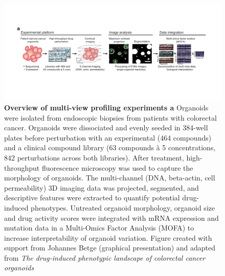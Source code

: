 \begin{flushleft}
\begin{figure}[h]
\centering
\includegraphics[width=\textwidth,
                height=\textheight,
                keepaspectratio]{figures/promise/pdf/fig_1_1.pdf}
\caption[Overview of multi-view profiling experiments]{\textbf{Overview of multi-view profiling experiments a} Organoids were isolated from endoscopic biopsies from patients with colorectal cancer. Organoids were dissociated and evenly seeded in 384-well plates before perturbation with an experimental (464 compounds) and a clinical compound library (63 compounds à 5 concentrations, 842 perturbations across both libraries). After treatment, high-throughput fluorescence microscopy was used to capture the morphology of organoids.  The multi-channel (DNA, beta-actin, cell permeability) 3D imaging data was projected, segmented, and descriptive features were extracted to quantify potential drug-induced phenotypes. Untreated organoid morphology, organoid size and drug activity scores were integrated with mRNA expression and mutation data in a Multi-Omics Factor Analysis (MOFA) to increase interpretability of organoid variation. Figure created with support from Johannes Betge (graphical presentation) and adapted from \textit{The drug-induced phenotypic landscape of colorectal cancer organoids} \citep{Betge2022-kr}}
\label{fig_130}
\end{figure}



\end{flushleft}
